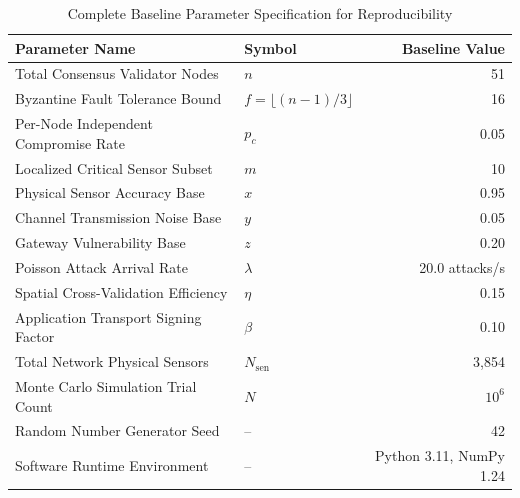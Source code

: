 \documentclass[10pt,twocolumn,journal]{IEEEtran}
\begin{document}
\begin{table}[htbp]
\caption{Complete Baseline Parameter Specification for Reproducibility}
\label{tab:reproducibility}
\centering
\scriptsize
\begin{tabular}{@{}llr@{}}
\toprule
\textbf{Parameter Name} & \textbf{Symbol} & \textbf{Baseline Value} \\
\midrule
Total Consensus Validator Nodes & $n$ & 51 \\
Byzantine Fault Tolerance Bound & $f = \lfloor(n-1)/3\rfloor$ & 16 \\
Per-Node Independent Compromise Rate & $p_c$ & 0.05 \\
Localized Critical Sensor Subset & $m$ & 10 \\
Physical Sensor Accuracy Base & $x$ & 0.95 \\
Channel Transmission Noise Base & $y$ & 0.05 \\
Gateway Vulnerability Base & $z$ & 0.20 \\
Poisson Attack Arrival Rate & $\lambda$ & 20.0 attacks/s \\
Spatial Cross-Validation Efficiency & $\eta$ & 0.15 \\
Application Transport Signing Factor & $\beta$ & 0.10 \\
Total Network Physical Sensors & $N_{\text{sen}}$ & 3,854 \\
Monte Carlo Simulation Trial Count & $N$ & $10^6$ \\
Random Number Generator Seed & -- & 42 \\
Software Runtime Environment & -- & Python 3.11, NumPy 1.24 \\
\bottomrule
\end{tabular}
\end{table}
\end{document}
